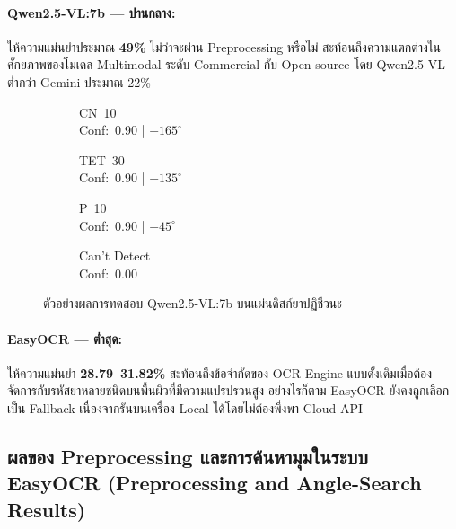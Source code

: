 \paragraph{Qwen2.5-VL:7b — ปานกลาง:}
ให้ความแม่นยำประมาณ \textbf{49\%} ไม่ว่าจะผ่าน Preprocessing หรือไม่ สะท้อนถึงความแตกต่างในศักยภาพของโมเดล Multimodal ระดับ Commercial กับ Open-source โดย Qwen2.5-VL ต่ำกว่า Gemini ประมาณ 22\%
\begin{figure}[H]
  \centering
  \begin{subfigure}[b]{0.23\textwidth}
    \centering
    \caption*{CN~10\\Conf:~0.90 | $-165^\circ$}
  \end{subfigure}\hfill
  \begin{subfigure}[b]{0.23\textwidth}
    \centering
    \caption*{TET~30\\Conf:~0.90 | $-135^\circ$}
  \end{subfigure}\hfill
  \begin{subfigure}[b]{0.23\textwidth}
    \centering
    \caption*{P~10\\Conf:~0.90 | $-45^\circ$}
  \end{subfigure}\hfill
  \begin{subfigure}[b]{0.23\textwidth}
    \centering
    \caption*{Can't Detect\\Conf:~0.00}
  \end{subfigure}
  \caption{ตัวอย่างผลการทดสอบ Qwen2.5-VL:7b บนแผ่นดิสก์ยาปฏิชีวนะ}
  \label{fig:qwen_ocr_results}
\end{figure}


\paragraph{EasyOCR — ต่ำสุด:}
ให้ความแม่นยำ \textbf{28.79--31.82\%} สะท้อนถึงข้อจำกัดของ OCR Engine แบบดั้งเดิมเมื่อต้องจัดการกับรหัสยาหลายชนิดบนพื้นผิวที่มีความแปรปรวนสูง อย่างไรก็ตาม EasyOCR ยังคงถูกเลือกเป็น Fallback เนื่องจากรันบนเครื่อง Local ได้โดยไม่ต้องพึ่งพา Cloud API

\subsection{ผลของ Preprocessing และการค้นหามุมในระบบ EasyOCR (Preprocessing and Angle-Search Results)}

